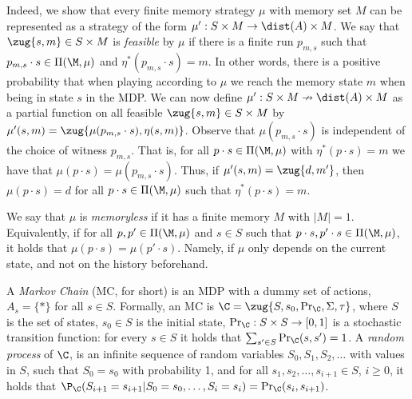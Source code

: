 \documentclass{lmcs}
\newcommand{\set}[1]{\{ #1 \}}
\begin{document}
Indeed, we show that every finite memory strategy $\mu$ with memory set $M$ can be represented as a strategy of the form $\mu':S\times M \rightarrow \dist(A)\times M$. We say that $\zug{s,m}\in S\times M$ is \emph{feasible} by $\mu$ if there is a finite run $p_{m,s}$ such that $p_{m,s}\cdot s\in \Pi(\M,\mu)$ and $\eta^*(p_{m,s}\cdot s)=m$. In other words, there is a positive probability that when playing according to $\mu$ we reach the memory state $m$ when being in state $s$ in the MDP. We can now define $\mu': S\times M\nrightarrow \dist(A)\times M$ as a partial function on all feasible $\zug{s, m}\in S\times M$ by $\mu'(s,m)=\zug{\mu(p_{m,s}\cdot s),\eta(s,m)}$.  Observe that $\mu(p_{m,s}\cdot s)$ is independent of the choice of witness $p_{m,s}$. That is, for all $p\cdot s\in \Pi(\M,\mu)$ with $\eta^*(p\cdot s)=m$ we have that $\mu(p\cdot s)=\mu(p_{m,s}\cdot s)$. Thus, if $\mu'(s,m)=\zug{d,m'}$, then $\mu(p\cdot s)=d$ for all $p\cdot s\in \Pi(\M,\mu)$ such that $\eta^*(p\cdot s)=m$.

We say that $\mu$ is \emph{memoryless} if it has a finite memory $M$ with $|M|=1$. Equivalently, if for all $p,p'\in \Pi(\M,\mu)$ and $s\in S$ such that $p\cdot s,p'\cdot s\in \Pi(\M,\mu)$, it holds that $\mu(p\cdot s)=\mu(p'\cdot s)$. Namely, if $\mu$ only depends on the current state, and not on the history beforehand.


A \emph{Markov Chain} (MC, for short) is an MDP with a dummy set of actions, $A_s=\set{\ast}$ for all $s\in S$. Formally, an MC is $\C=\zug{S,s_0,\Pr_\C,\Sigma,\tau}$, where $S$ is the set of states, $s_0\in S$ is the initial state, $\Pr_\C:S\times S\rightarrow[0,1]$ is a stochastic transition function: for every $s\in S$ it holds that $\sum_{s'\in S}\Pr_\C(s,s')=1$. A \emph{random process} of $\C$, is an infinite sequence of random variables $S_0,S_1,S_2,\ldots$ with values in $S$, such that $S_0=s_0$ with probability 1, and for all $s_1,s_2,\ldots,s_{i+1}\in S$, $i\geq 0$, it holds that $\P_\C(S_{i+1}=s_{i+1}|S_0 = s_0,\ldots,S_i=s_i)=\Pr_\C(s_i,s_{i+1})$.  
\end{document}
